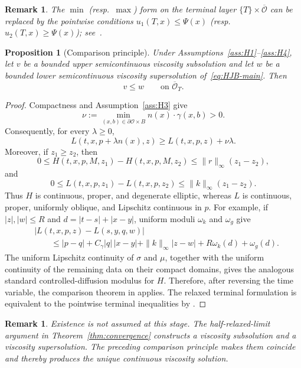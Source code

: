 \documentclass[10pt,a4paper]{amsart}
\newtheorem{proposition}[theorem]{Proposition}
\newtheorem{remark}[theorem]{Remark}
\newcommand{\cO}{\mathcal{O}}
\begin{document}
	\begin{remark} \upshape The $\min$ (resp.\ $\max$) form on the terminal layer $\{T\}\times\overline{\cO}$ can be replaced by the pointwise conditions $u_1(T,x)\le\Psi(x)$ (resp.\ $u_2(T,x)\ge\Psi(x)$); see~\cite[Proposition~6]{Bourgoing2008}.
	\end{remark}
	\begin{proposition}[Comparison principle] \upshape\label{thm:wellposed}
		Under Assumptions~\ref{ass:H1}--\ref{ass:H4}, let $v$ be a bounded
		upper semicontinuous viscosity subsolution and let $w$ be a bounded lower
		semicontinuous viscosity supersolution of~\eqref{eq:HJB-main}.  Then
		\[
		v\le w\qquad\text{on }\overline{\cO}_T.
		\]
	\end{proposition}
	\begin{proof}
		Compactness and Assumption~\ref{ass:H3} give
		\[
		\nu:=\min_{(x,b)\in\partial\cO\times B}
		n(x)\cdot\gamma(x,b)>0.
		\]
		Consequently, for every $\lambda\ge0$,
		\[
		L(t,x,p+\lambda n(x),z)
		\ge L(t,x,p,z)+\nu\lambda .
		\]
		Moreover, if $z_1\ge z_2$, then
		\[
		0\le H(t,x,p,M,z_1)-H(t,x,p,M,z_2)
		\le \|r\|_\infty(z_1-z_2),
		\]
		and
		\[
		0\le L(t,x,p,z_1)-L(t,x,p,z_2)
		\le \|k\|_\infty(z_1-z_2).
		\]
		Thus $H$ is continuous, proper, and degenerate elliptic, whereas $L$ is
		continuous, proper, uniformly oblique, and Lipschitz continuous in $p$.
		For example, if $|z|,|w|\le R$ and $d=|t-s|+|x-y|$, uniform moduli
		$\omega_k$ and $\omega_g$ give
		\begin{align*}
		&|L(t,x,p,z)-L(s,y,q,w)|\\
		&\qquad\le |p-q|+C_\gamma|q|\,|x-y|
		+\|k\|_\infty|z-w|+R\omega_k(d)+\omega_g(d).
		\end{align*}
		The uniform Lipschitz continuity of $\sigma$ and $\mu$, together with the
		uniform continuity of the remaining data on their compact domains, gives
		the analogous standard controlled-diffusion modulus for $H$.  Therefore,
		after reversing the
		time variable, the comparison theorem in
		\cite[Theorem~II.1]{Barles1993} applies.  The relaxed terminal formulation
		is equivalent to the pointwise terminal inequalities by
		\cite[Proposition~6]{Bourgoing2008}.
	\end{proof}
	\begin{remark} \upshape
		Existence is not assumed at this stage.  The half-relaxed-limit argument in
		Theorem~\ref{thm:convergence} constructs a viscosity subsolution and a
		viscosity supersolution.  The preceding comparison principle makes them
		coincide and thereby produces the unique continuous viscosity solution.
	\end{remark}
	
\end{document}
